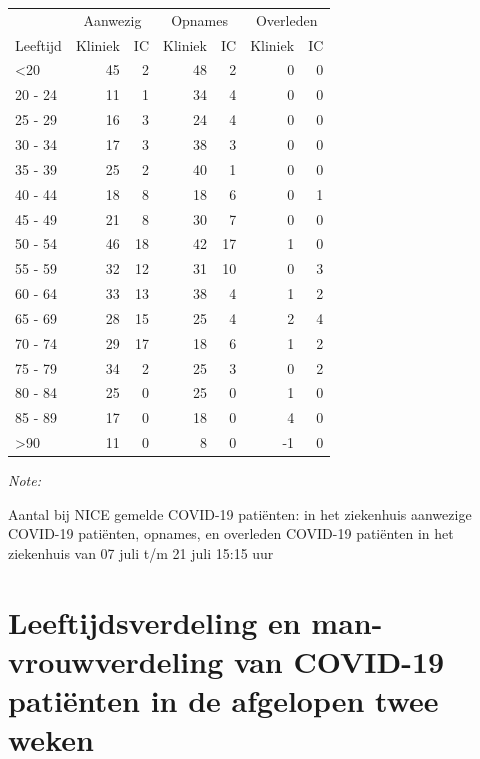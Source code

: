 \documentclass[
  english,
  man,floatsintext]{apa6}
\begin{document}
\begin{table}
\centering\begingroup\fontsize{10}{12}\selectfont

\begin{threeparttable}
\begin{tabular}{lrrrrrr}
\toprule
\multicolumn{1}{c}{ } & \multicolumn{2}{c}{Aanwezig} & \multicolumn{2}{c}{Opnames} & \multicolumn{2}{c}{Overleden} \\
\cmidrule(l{3pt}r{3pt}){2-3} \cmidrule(l{3pt}r{3pt}){4-5} \cmidrule(l{3pt}r{3pt}){6-7}
Leeftijd & Kliniek & IC & Kliniek & IC & Kliniek & IC\\
\midrule
<20 & 45 & 2 & 48 & 2 & 0 & 0\\
20 - 24 & 11 & 1 & 34 & 4 & 0 & 0\\
25 - 29 & 16 & 3 & 24 & 4 & 0 & 0\\
30 - 34 & 17 & 3 & 38 & 3 & 0 & 0\\
35 - 39 & 25 & 2 & 40 & 1 & 0 & 0\\
40 - 44 & 18 & 8 & 18 & 6 & 0 & 1\\
45 - 49 & 21 & 8 & 30 & 7 & 0 & 0\\
50 - 54 & 46 & 18 & 42 & 17 & 1 & 0\\
55 - 59 & 32 & 12 & 31 & 10 & 0 & 3\\
60 - 64 & 33 & 13 & 38 & 4 & 1 & 2\\
65 - 69 & 28 & 15 & 25 & 4 & 2 & 4\\
70 - 74 & 29 & 17 & 18 & 6 & 1 & 2\\
75 - 79 & 34 & 2 & 25 & 3 & 0 & 2\\
80 - 84 & 25 & 0 & 25 & 0 & 1 & 0\\
85 - 89 & 17 & 0 & 18 & 0 & 4 & 0\\
>90 & 11 & 0 & 8 & 0 & -1 & 0\\
\bottomrule
\end{tabular}
\begin{tablenotes}
\item \textit{Note: } 
\item Aantal bij NICE gemelde COVID-19 patiënten: in het ziekenhuis aanwezige COVID-19 patiënten, opnames, en overleden COVID-19 patiënten in het ziekenhuis van 07 juli t/m 21 juli 15:15 uur
\end{tablenotes}
\end{threeparttable}
\endgroup{}
\end{table}

\newpage

\hypertarget{leeftijdsverdeling-en-man-vrouwverdeling-van-covid-19-patiuxebnten-in-de-afgelopen-twee-weken}{%
\section{Leeftijdsverdeling en man-vrouwverdeling van COVID-19 patiënten in de afgelopen twee weken}\label{leeftijdsverdeling-en-man-vrouwverdeling-van-covid-19-patiuxebnten-in-de-afgelopen-twee-weken}}
\end{document}
